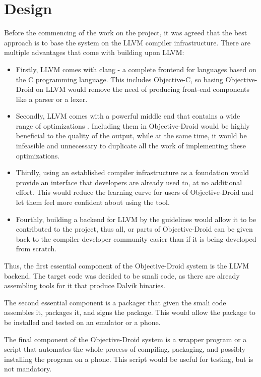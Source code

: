\documentclass[parskip]{cs4rep}
\begin{document}
\section{Design}

Before the commencing of the work on the project, it was agreed that the best approach is to base the system on the LLVM compiler infrastructure. There are multiple advantages that come with building upon LLVM:
\begin{itemize}
\item
Firstly, LLVM comes with clang - a complete frontend for languages based on the C programming language. This includes Objective-C, so basing Objective-Droid on LLVM would remove the need of producing front-end components like a parser or a lexer.
\item
Secondly, LLVM comes with a powerful middle end that contains a wide range of optimizations \cite{P7}. Including them in Objective-Droid would be highly beneficial to the quality of the output, while at the same time, it would be infeasible and unnecessary to duplicate all the work of implementing these optimizations.
\item
Thirdly, using an established compiler infrastructure as a foundation would provide an interface that developers are already used to, at no additional effort. This would reduce the learning curve for users of Objective-Droid and let them feel more confident about using the tool.
\item
Fourthly, building a backend for LLVM by the guidelines would allow it to be contributed to the project, thus all, or parts of Objective-Droid can be given back to the compiler developer community easier than if it is being developed from scratch.
\end{itemize}
Thus, the first essential component of the Objective-Droid system is the LLVM backend. The target code was decided to be smali code, as there are already assembling tools for it that produce Dalvik binaries.

The second essential component is a packager that given the smali code assembles it, packages it, and signs the package. This would allow the package to be installed and tested on an emulator or a phone.

The final component of the Objective-Droid system is a wrapper program or a script that automates the whole process of compiling, packaging, and possibly installing the program on a phone. This script would be useful for testing, but is not mandatory.
\end{document}
